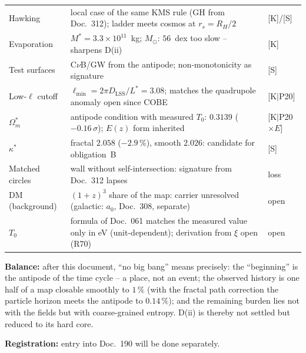 {\begin{longtable}{lp{6.4cm}l}
Hawking & local case of the same KMS rule (GH from Doc.~312);
  ladder meets cosmos at $r_s = R_H/2$ & [K]/[S] \\
Evaporation & $M^{*} = 3.3\times10^{11}$~kg; $M_\odot$: $56$~dex
  too slow -- sharpens D(ii) & [K] \\
Test surfaces & C$\nu$B/GW from the antipode; non-monotonicity as
  signature & [S] \\
Low-$\ell$ cutoff & $\ell_\text{min} = 2\pi D_\text{LSS}/L^{*} =
  3.08$; matches the quadrupole anomaly open since COBE
  & [K$|$P20] \\
$\Omega_m^{*}$ & antipode condition with measured $T_0$:
  $0.3139$ ($-0.16\,\sigma$); $E(z)$ form inherited
  & [K$|$P20$\times$$E$] \\
$\kappa^{*}$ & fractal $2.058$ ($-2.9\,\%$), smooth $2.026$:
  candidate for obligation~B & [S] \\
Matched circles & wall without self-intersection: signature from
  Doc.~312 lapses & loss \\
DM (background) & $(1{+}z)^3$ share of the map: carrier
  unresolved (galactic: $a_0$, Doc.~308, separate) & open \\
$T_0$ & formula of Doc.~061 matches the measured value only in eV
  (unit-dependent); derivation from $\xi$ open (R70) & open \\
\end{longtable}
}

\medskip
\noindent\textbf{Balance:} after this document, \enquote{no big
bang} means precisely: the \enquote{beginning} is the antipode of
the time cycle -- a place, not an event; the observed history is
one half of a map closable smoothly to $1\,\%$ (with the fractal
path correction the particle horizon meets the antipode to
$0.14\,\%$); and the remaining
burden lies not with the fields but with coarse-grained entropy.
D(ii) is thereby not settled but reduced to its hard core.

\medskip
\noindent\textbf{Registration:} entry into Doc.~190 will be done
separately.


